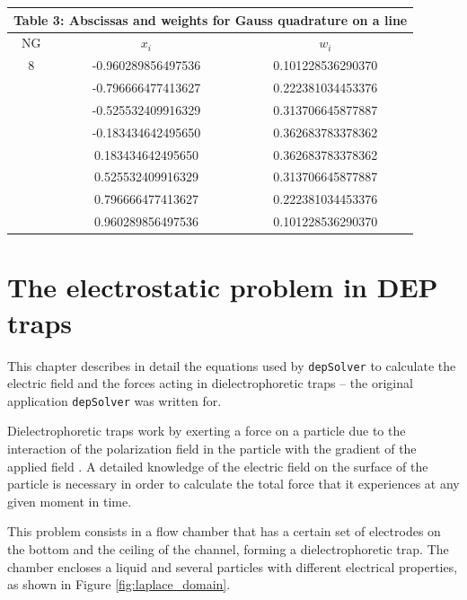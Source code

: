 \documentclass[12pt]{report}
\begin{document}
\begin{center}
\begin{tabular}{|c|c|c|}
\multicolumn{3}{c}{Table 3: Abscissas and weights for Gauss quadrature on a line}\\
\hline
NG & $x_i$ & $w_i$\\
\hline\hline
8 & -0.960289856497536 & 0.101228536290370\\
 & -0.796666477413627 & 0.222381034453376\\
 & -0.525532409916329 & 0.313706645877887\\
 & -0.183434642495650 & 0.362683783378362\\
 & 0.183434642495650 & 0.362683783378362\\
 & 0.525532409916329 & 0.313706645877887\\
 & 0.796666477413627 & 0.222381034453376\\
 & 0.960289856497536 & 0.101228536290370\\
\hline
\end{tabular}
\end{center}

\pagebreak
\section*{}
\pagebreak
\chapter{The electrostatic problem in DEP traps}\label{sec_electrostatic}
This chapter describes in detail the equations used by \verb+depSolver+ to calculate the electric field and the forces acting in dielectrophoretic traps -- the original application \verb+depSolver+ was written for.

Dielectrophoretic traps work by exerting a force on a particle due to the interaction of the polarization field in the particle with the gradient of the applied field \cite{Jones1995}. A detailed knowledge of the electric field on the surface of the particle is necessary in order to calculate the total force that it experiences at any given moment in time.

This problem consists in a flow chamber that has a certain set of electrodes on the bottom and the ceiling of the channel, forming a dielectrophoretic trap. The chamber encloses a liquid and several particles with different electrical properties, as shown in Figure \ref{fig:laplace_domain}.
\end{document}
